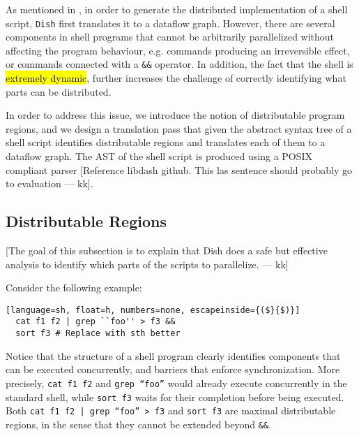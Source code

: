 \documentclass[sigplan,10pt,review,anonymous]{acmart}
\newcommand{\ttt}[1]{\texttt{\small #1}}
\newcommand{\todo}[1]{\hl{#1}\xspace}
\newcommand{\kk}[1]{[{\color{magenta}#1 --- kk}]}
\begin{document}
As mentioned in , in order to generate the distributed
implementation of a shell script, \ttt{Dish} first translates it to
a dataflow graph. However, there are several components in shell
programs that cannot be arbitrarily parallelized without affecting the
program behaviour, e.g. commands producing an irreversible effect, or
commands connected with a \ttt{\&\&} operator. In addition, the
fact that the shell is \todo{extremely dynamic}, further increases the
challenge of correctly identifying what parts can be distributed.


In order to address this issue, we introduce the notion of
distributable program regions, and we design a translation pass that
given the abstract syntax tree of a shell script identifies
distributable regions and translates each of them to a dataflow
graph. The AST of the shell script is produced using a POSIX compliant
parser \kk{Reference libdash github. This las sentence should probably
  go to evaluation}.

\subsection{Distributable Regions}


\kk{The goal of this subsection is to explain that Dish does a safe
  but effective analysis to identify which parts of the scripts to
  parallelize.}

Consider the following example:

\begin{lstlisting}[language=sh, float=h, numbers=none, escapeinside={($}{$)}]
  cat f1 f2 | grep ``foo'' > f3 &&
  sort f3 # Replace with sth better
\end{lstlisting}

Notice that the structure of a shell program clearly identifies
components that can be executed concurrently, and barriers that
enforce synchronization. More precisely, \ttt{cat f1 f2} and
\ttt{grep ``foo''} would already execute concurrently in the
standard shell, while \ttt{sort f3} waits for their completion
before being executed. Both \ttt{cat f1 f2 | grep ``foo'' > f3} and
\ttt{sort f3} are maximal distributable regions, in the sense that
they cannot be extended beyond \ttt{\&\&}.
\end{document}
